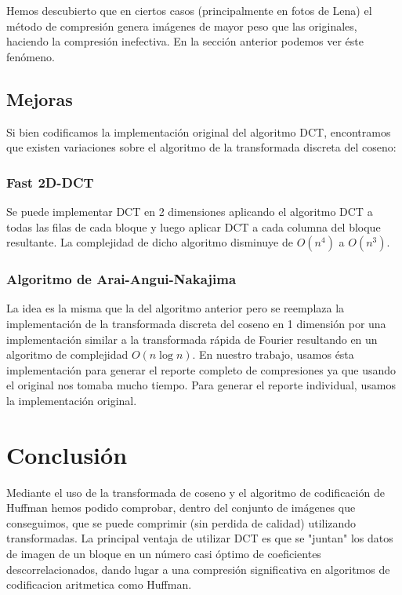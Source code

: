 \documentclass[spanish]{scrartcl}
\begin{document}
Hemos descubierto que en ciertos casos (principalmente en fotos de Lena) el método de compresión genera imágenes de mayor peso que las originales, haciendo la compresión inefectiva. En la sección anterior podemos ver éste fenómeno.

\subsection{Mejoras}
Si bien codificamos la implementación original del algoritmo DCT, encontramos que existen variaciones sobre el algoritmo de la transformada discreta del coseno:

\subsubsection{Fast 2D-DCT}

Se puede implementar DCT en 2 dimensiones aplicando el algoritmo DCT a todas las filas de cada bloque y luego aplicar DCT a cada columna del bloque resultante. La complejidad de dicho algoritmo disminuye de $O(n^4)$ a $O(n^3)$\cite{unix4lyfe_DCT}.

\subsubsection{Algoritmo de Arai-Angui-Nakajima}

La idea es la misma que la del algoritmo anterior pero se reemplaza la implementación de la transformada discreta del coseno en 1 dimensión por una implementación similar a la transformada rápida de Fourier resultando en un algoritmo de complejidad $O(n\log{n})$. En nuestro trabajo, usamos ésta implementación para generar el reporte completo de compresiones ya que usando el original nos tomaba mucho tiempo. Para generar el reporte individual, usamos la implementación original\cite{unix4lyfe_AAN}\cite{unix4lyfe_DCT}.

\section{Conclusión}
Mediante el uso de la transformada de coseno y el algoritmo de codificación de Huffman hemos podido comprobar, dentro del conjunto de imágenes que conseguimos, que se puede comprimir (sin perdida de calidad) utilizando transformadas. La principal ventaja de utilizar DCT es que se "juntan" los datos de imagen de un bloque en un número casi óptimo de coeficientes descorrelacionados, dando lugar a una compresión significativa en algoritmos de codificacion aritmetica como Huffman.
\end{document}
